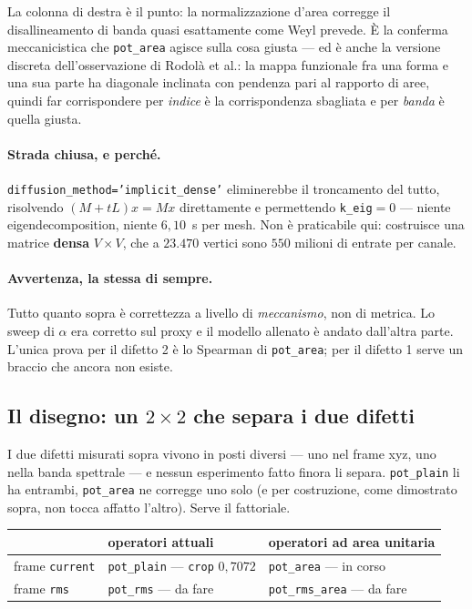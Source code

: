 \documentclass[11pt,a4paper]{article}
\begin{document}
La colonna di destra \`e il punto: la normalizzazione d'area corregge il disallineamento di
banda quasi esattamente come Weyl prevede. \`E la conferma meccanicistica che
\texttt{pot\_area} agisce sulla cosa giusta --- ed \`e anche la versione discreta
dell'osservazione di Rodol\`a et al.: la mappa funzionale fra una forma e una sua parte ha
diagonale inclinata con pendenza pari al rapporto di aree, quindi far corrispondere per
\emph{indice} \`e la corrispondenza sbagliata e per \emph{banda} \`e quella giusta.

\paragraph{Strada chiusa, e perch\'e.} \texttt{diffusion\_method='implicit\_dense'} eliminerebbe
il troncamento del tutto, risolvendo $(M+tL)x = Mx$ direttamente e permettendo
\texttt{k\_eig}$=0$ --- niente eigendecomposition, niente $6{,}10$~s per mesh. Non \`e
praticabile qui: costruisce una matrice \textbf{densa} $V\times V$, che a $23{.}470$ vertici sono
$550$ milioni di entrate per canale.

\paragraph{Avvertenza, la stessa di sempre.} Tutto quanto sopra \`e correttezza a livello di
\emph{meccanismo}, non di metrica. Lo sweep di $\alpha$ era corretto sul proxy e il modello
allenato \`e andato dall'altra parte. L'unica prova per il difetto 2 \`e lo Spearman di
\texttt{pot\_area}; per il difetto 1 serve un braccio che ancora non esiste.


\subsection*{Il disegno: un $2\times2$ che separa i due difetti}

I due difetti misurati sopra vivono in posti diversi --- uno nel frame xyz, uno nella banda
spettrale --- e nessun esperimento fatto finora li separa. \texttt{pot\_plain} li ha entrambi,
\texttt{pot\_area} ne corregge uno solo (e per costruzione, come dimostrato sopra, non tocca
affatto l'altro). Serve il fattoriale.

\begin{center}\small
\begin{tabular}{lll}
\toprule
 & operatori attuali & operatori ad area unitaria \\
\midrule
frame \texttt{current} & \texttt{pot\_plain} --- \texttt{crop} $0{,}7072$ & \texttt{pot\_area} --- in corso \\
frame \texttt{rms}     & \texttt{pot\_rms} --- da fare                    & \texttt{pot\_rms\_area} --- da fare \\
\bottomrule
\end{tabular}
\end{center}
\end{document}
